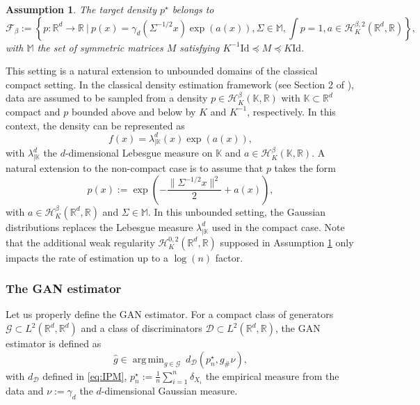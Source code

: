 \documentclass{article}
\newtheorem{assumption}{Assumption}
\DeclareMathOperator*{\argmin}{arg\,min}
\begin{document}
\begin{assumption}\label{assump:gandens}
    The target density $p^\star$ belongs to
    $$\mathcal{F}_\beta:=\left\{p:\mathbb{R}^d\rightarrow \mathbb{R}\ \Big|\ p(x)=\gamma_d(\Sigma^{-1/2}x)\exp\left(a(x)\right),\Sigma \in \mathbb{M}, \int p=1, a \in \mathcal{H}^{\beta,2}_K(\mathbb{R}^d,\mathbb{R})\right\},$$
    with $\mathbb{M}$ the set of  symmetric  matrices $M$ satisfying $K^{-1}\text{Id}\preceq M\preceq K\text{Id}$.
\end{assumption}
This setting is a natural extension to unbounded domains of the classical compact setting. In the classical density estimation framework (see Section 2 of \cite{Tsybakov2008IntroductionTN}), data are assumed to be sampled from a density $p\in \mathcal{H}^{\beta}_K(\mathbb{K},\mathbb{R})$ with $\mathbb{K}\subset \mathbb{R}^d$ compact and $p$ bounded above and below by $K$ and $K^{-1}$, respectively. In this context, the density can be represented as$$f(x)=\lambda^{d}_{|\mathbb{K}}(x)\exp(a(x)),$$ with $\lambda^{d}_{|\mathbb{K}}$ the $d$-dimensional Lebesgue measure on $\mathbb{K}$ and $a\in \mathcal{H}^{\beta}_K(\mathbb{K},\mathbb{R})$. A natural extension to the non-compact case is to assume that  $p$ takes the form \begin{equation*}
p(x):=\exp\left(-\frac{\|\Sigma^{-1/2}x\|^2}{2}+a(x)\right),
\end{equation*}
with $a \in \mathcal{H}^{\beta}_K(\mathbb{R}^d,\mathbb{R})$ and $\Sigma \in \mathbb{M}$. In this unbounded setting, the Gaussian distributions replaces the Lebesgue measure $\lambda^{d}_{|\mathbb{K}}$ used in the compact case. Note that the additional weak regularity $\mathcal{H}^{0,2}_K(\mathbb{R}^d,\mathbb{R})$ supposed in Assumption \ref{assump:gandens} only impacts the rate of estimation up to a $\log(n)$ factor.  

\subsubsection{The GAN estimator}

Let us properly define the GAN estimator. For a compact class of generators $\mathcal{G}\subset L^2(\mathbb{R}^d,\mathbb{R}^d)$ and a class of discriminators $\mathcal{D}\subset L^2(\mathbb{R}^d,\mathbb{R})$, the GAN estimator is defined as
\begin{equation}\label{eq:gan}
    \hat{g}\in \argmin_{g\in \mathcal{G}}\ d_{ \mathcal{D}} (p^\star_n,g_{\# }\nu),
\end{equation}
with $d_{ \mathcal{D}}$ defined in \eqref{eq:IPM}, $p^\star_n:=\frac{1}{n}\sum_{i=1}^n \delta_{X_i}$ the empirical measure from the data and $\nu:=\gamma_d$ the $d$-dimensional Gaussian measure.
\end{document}
